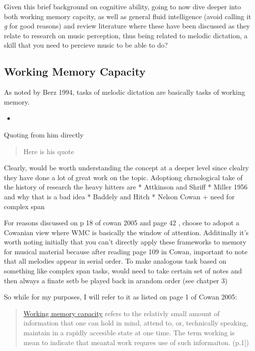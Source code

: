 \documentclass[]{book}
\providecommand{\tightlist}{%
  \setlength{\itemsep}{0pt}\setlength{\parskip}{0pt}}
\theoremstyle{definition}
\theoremstyle{definition}
\theoremstyle{definition}
\theoremstyle{remark}
\begin{document}
Given this brief background on cognitive ability, going to now dive
deeper into both working memory capcity, as well as general fluid
intelligence (avoid calling it \emph{g} for good reasons) and review
literature where these have been discussed as they relate to research on
music perception, thus being related to melodic dictation, a skill that
you need to percieve music to be able to do?

\hypertarget{working-memory-capacity}{%
\subsection{Working Memory Capacity}\label{working-memory-capacity}}

As noted by Berz 1994, tasks of melodic dictation are basically tasks of
working memory.

\begin{itemize}
\tightlist
\item
  \citep{berzWorkingMemoryMusic1995}
\end{itemize}

Quoting from him directly

\begin{quote}
Here is his quote
\end{quote}

Clearly, would be worth understanding the concept at a deeper level
since clealry they have done a lot of great work on the topic. Adoptiong
chrnological take of the history of research the heavy hitters are *
Attkinson and Shriff * Miller 1956 and why that is a bad idea * Baddely
and Hitch * Nelson Cowan + need for complex span

For reasons discussed on p 18 of cowan 2005 and page 42 , choose to
adopot a Cowanian view where WMC is basically the window of attention.
Additinally it's worth noting initially that you can't directly apply
these frameworks to memory for musical material because after reading
page 109 in Cowan, important to note that all melodies appear in serial
order. To make analogous task based on something like complex span
tasks, would need to take certain set of notes and then always a finate
setb be played back in arandom order (see chatper 3)

So while for my purposes, I will refer to it as listed on page 1 of
Cowan 2005:

\begin{quote}
\protect\hyperlink{working-memory-capacity}{Working memory capacity}
refers to the relativly small amount of information that one can hold in
mind, attend to, or, technically speaking, maintain in a rapidly
accesible state at one time. The term working is mean to indicate that
meantal work requres use of such informaiton. (p.1{]})
\end{quote}
\end{document}
